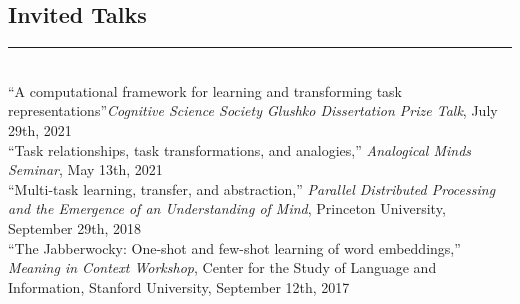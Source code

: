 \documentclass[margin]{res}
\begin{document}
\begin{resume}
\vspace{1pt}\section{Invited Talks} \vspace{-15pt} \rule{\textwidth}{0.5pt} \\[3pt]
{``A computational framework for learning and transforming task representations''}\textit{Cognitive Science Society Glushko Dissertation Prize Talk}, July 29th, 2021\\[3pt] 
{``Task relationships, task transformations, and analogies,''} \textit{Analogical Minds Seminar}, May 13th, 2021\\[3pt] 
{``Multi-task learning, transfer, and abstraction,''} \textit{Parallel Distributed Processing and the Emergence of an Understanding of Mind}, Princeton University, September 29th, 2018\\[3pt] 
{``The Jabberwocky: One-shot and few-shot learning of word embeddings,''} \textit{Meaning in Context Workshop}, Center for the Study of Language and Information,  Stanford University, September 12th, 2017 
 


\end{resume}
\end{document}
